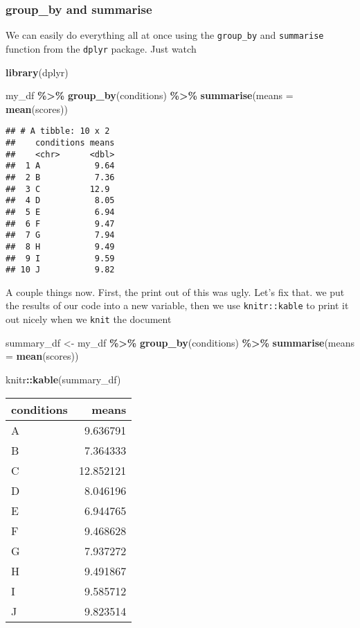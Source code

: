 \documentclass[
]{book}
\newenvironment{Shaded}{\begin{snugshade}}{\end{snugshade}}
\newcommand{\AttributeTok}[1]{\textcolor[rgb]{0.13,0.29,0.53}{#1}}
\newcommand{\FunctionTok}[1]{\textcolor[rgb]{0.13,0.29,0.53}{\textbf{#1}}}
\newcommand{\NormalTok}[1]{#1}
\newcommand{\OtherTok}[1]{\textcolor[rgb]{0.56,0.35,0.01}{#1}}
\newcommand{\SpecialCharTok}[1]{\textcolor[rgb]{0.81,0.36,0.00}{\textbf{#1}}}
\begin{document}
\hypertarget{group_by-and-summarise}{%
\subsubsection{group\_by and summarise}\label{group_by-and-summarise}}

We can easily do everything all at once using the \texttt{group\_by} and \texttt{summarise} function from the \texttt{dplyr} package. Just watch

\begin{Shaded}
\begin{Highlighting}[]
\FunctionTok{library}\NormalTok{(dplyr)}

\NormalTok{my\_df }\SpecialCharTok{\%\textgreater{}\%}
  \FunctionTok{group\_by}\NormalTok{(conditions) }\SpecialCharTok{\%\textgreater{}\%}
  \FunctionTok{summarise}\NormalTok{(}\AttributeTok{means =} \FunctionTok{mean}\NormalTok{(scores))}
\end{Highlighting}
\end{Shaded}

\begin{verbatim}
## # A tibble: 10 x 2
##    conditions means
##    <chr>      <dbl>
##  1 A           9.64
##  2 B           7.36
##  3 C          12.9 
##  4 D           8.05
##  5 E           6.94
##  6 F           9.47
##  7 G           7.94
##  8 H           9.49
##  9 I           9.59
## 10 J           9.82
\end{verbatim}

A couple things now. First, the print out of this was ugly. Let's fix that. we put the results of our code into a new variable, then we use \texttt{knitr::kable} to print it out nicely when we \texttt{knit} the document

\begin{Shaded}
\begin{Highlighting}[]
\NormalTok{summary\_df }\OtherTok{\textless{}{-}}\NormalTok{ my\_df }\SpecialCharTok{\%\textgreater{}\%}
               \FunctionTok{group\_by}\NormalTok{(conditions) }\SpecialCharTok{\%\textgreater{}\%}
               \FunctionTok{summarise}\NormalTok{(}\AttributeTok{means =} \FunctionTok{mean}\NormalTok{(scores))}

\NormalTok{knitr}\SpecialCharTok{::}\FunctionTok{kable}\NormalTok{(summary\_df)}
\end{Highlighting}
\end{Shaded}

\begin{tabular}{l|r}
\hline
conditions & means\\
\hline
A & 9.636791\\
\hline
B & 7.364333\\
\hline
C & 12.852121\\
\hline
D & 8.046196\\
\hline
E & 6.944765\\
\hline
F & 9.468628\\
\hline
G & 7.937272\\
\hline
H & 9.491867\\
\hline
I & 9.585712\\
\hline
J & 9.823514\\
\hline
\end{tabular}
\end{document}

